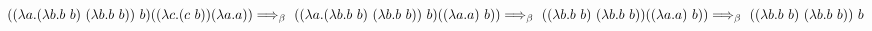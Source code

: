 \documentclass[12pt]{article}
\begin{document}
$((\lambda a.(\lambda b.b\ b)\ (\lambda b.b\ b))\ b)((\lambda c.(c\ b))(\lambda a.a)) 
\Longrightarrow_\beta\ ((\lambda a.(\lambda b.b\ b)\ (\lambda b.b\ b))\ b)((\lambda a.a)\ b))\\
\Longrightarrow_\beta\ ((\lambda b.b\ b)\ (\lambda b.b\ b))((\lambda a.a)\ b))
\Longrightarrow_\beta\ ((\lambda b.b\ b)\ (\lambda b.b\ b))\ b
$
\end{document}
